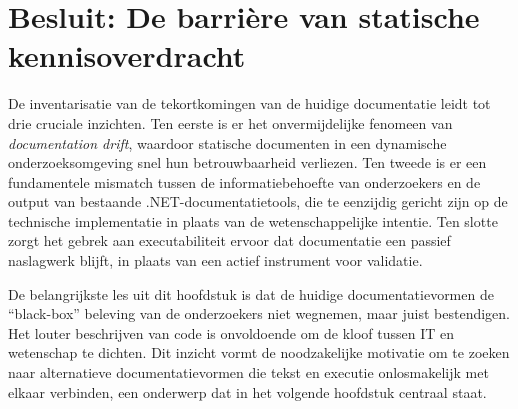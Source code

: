 \section{Besluit: De barrière van statische kennisoverdracht}
De inventarisatie van de tekortkomingen van de huidige documentatie leidt tot drie cruciale inzichten. Ten eerste is er het onvermijdelijke fenomeen van \textit{documentation drift}, waardoor statische documenten in een dynamische onderzoeksomgeving snel hun betrouwbaarheid verliezen. Ten tweede is er een fundamentele mismatch tussen de informatiebehoefte van onderzoekers en de output van bestaande .NET-documentatietools, die te eenzijdig gericht zijn op de technische implementatie in plaats van de wetenschappelijke intentie. Ten slotte zorgt het gebrek aan executabiliteit ervoor dat documentatie een passief naslagwerk blijft, in plaats van een actief instrument voor validatie.

De belangrijkste les uit dit hoofdstuk is dat de huidige documentatievormen de ``black-box'' beleving van de onderzoekers niet wegnemen, maar juist bestendigen. Het louter beschrijven van code is onvoldoende om de kloof tussen IT en wetenschap te dichten. Dit inzicht vormt de noodzakelijke motivatie om te zoeken naar alternatieve documentatievormen die tekst en executie onlosmakelijk met elkaar verbinden, een onderwerp dat in het volgende hoofdstuk centraal staat.
